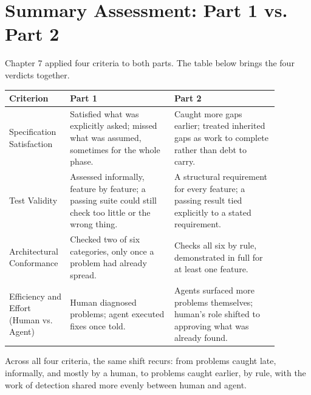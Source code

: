 \section{Summary Assessment: Part 1 vs. Part 2}

Chapter 7 applied four criteria to both parts. The table below brings the four verdicts together.

\begin{center}
\renewcommand{\arraystretch}{1.3}
\begin{tabular}{>{\raggedright\arraybackslash}p{0.16\linewidth} >{\raggedright\arraybackslash}p{0.36\linewidth} >{\raggedright\arraybackslash}p{0.36\linewidth}}
\toprule
\textbf{Criterion} & \textbf{Part 1} & \textbf{Part 2} \\
\midrule
Specification Satisfaction & Satisfied what was explicitly asked; missed what was assumed, sometimes for the whole phase. & Caught more gaps earlier; treated inherited gaps as work to complete rather than debt to carry. \\
Test Validity & Assessed informally, feature by feature; a passing suite could still check too little or the wrong thing. & A structural requirement for every feature; a passing result tied explicitly to a stated requirement. \\
Architectural Conformance & Checked two of six categories, only once a problem had already spread. & Checks all six by rule, demonstrated in full for at least one feature. \\
Efficiency and Effort (Human vs. Agent) & Human diagnosed problems; agent executed fixes once told. & Agents surfaced more problems themselves; human's role shifted to approving what was already found. \\
\bottomrule
\end{tabular}
\end{center}

Across all four criteria, the same shift recurs: from problems caught late, informally, and mostly by a human, to problems caught earlier, by rule, with the work of detection shared more evenly between human and agent.

